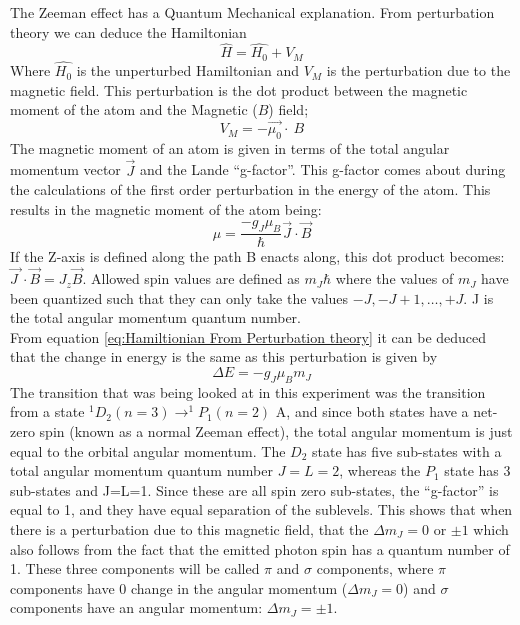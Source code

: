 \documentclass[a4paper,11pt]{article}
\begin{document}
The Zeeman effect has a Quantum Mechanical explanation. From perturbation theory we can deduce the Hamiltonian 
\begin{equation}
    \hat{H}=\widehat{H_0}+V_M  \label{eq:Hamiltionian From Perturbation theory}
\end{equation}
Where $\widehat{H_0}$ is the unperturbed Hamiltonian and $V_M$ is the perturbation due to the magnetic field. This perturbation is the dot product between the magnetic moment of the atom and the Magnetic ($B$) field; 
\begin{equation}
V_M=-\vec{\mu_0}\cdot\ B \label{eq: Purtubation}
\end{equation}
\cite{Perturbed} The magnetic moment of an atom is given in terms of the total angular momentum vector $\vec{J}$ and the Lande “g-factor”. This g-factor comes about during the calculations of the first order perturbation in the energy of the atom. This results in the magnetic moment of the atom being: 
\begin{equation}
    \mu=\frac{-g_J\mu_B}{\hbar}\vec{J}\cdot\vec{B} \label{eq: The magnetic moment of an atom}
\end{equation}
If the Z-axis is defined along the path B enacts along, this dot product becomes: $\vec{J\ }\cdot\vec{B}=J_z\vec{B}$. Allowed spin values are defined as $m_J\hbar$ where the values of $m_J$ have been quantized such that they can only take the values ${-J, -J+1, …, +J}$. J is the total angular momentum quantum number. \\

From equation \ref{eq:Hamiltionian From Perturbation theory} it can be deduced that the change in energy is the same as this perturbation is given by 
\begin{equation}
    \Delta E=-g_J\mu_Bm_J \label{eq: Definition of CHnage in Energy}
\end{equation}
The transition that was being looked at in this experiment was the transition from a state $^1D_2\left(n=3\right)\rightarrow^1P_1(n=2)$ A, and since both states have a net-zero spin (known as a normal Zeeman effect), the total angular momentum is just equal to the orbital angular momentum. The $D_2$ state has five sub-states with a total angular momentum quantum number $J=L=2$, whereas the $P_1$ state has 3 sub-states and J=L=1. Since these are all spin zero sub-states, the “g-factor” is equal to 1, and they have equal separation of the sublevels. This shows that when there is a perturbation due to this magnetic field, that the $\Delta m_J=0$ or $\pm1$ which also follows from the fact that the emitted photon spin has a quantum number of 1. These three components will be called $\pi$ and $\sigma$ components, where $\pi$ components have 0 change in the angular momentum ($\Delta m_J=0$) and $\sigma$ components have an angular momentum: $\Delta m_J=\pm1$.\\
\end{document}
